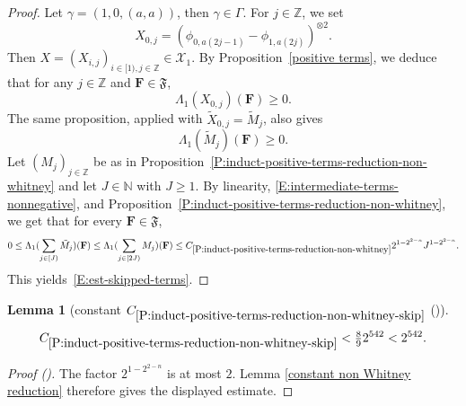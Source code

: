 \documentclass[12pt,reqno]{amsart}
\newcommand{\auto}{{({\tiny\faCar})}}
\theoremstyle{plain}
\newtheorem{lemma}[theorem]{Lemma}
\numberwithin{equation}{section}
\theoremstyle{remark}
\newcommand{\uses}[1]{}
\newcommand{\usesdefs}[1]{}
\newcommand{\Z}{{\mathbb Z}}
\newcommand{\N}{{\mathbb N}}
\begin{document}
\begin{proof}
Let $\gamma=(1,0,(a,a))$, then $\gamma \in \Gamma$. For $j\in \Z$, we set
\[
X_{0,j}=({\phi}_{0,a(2j-1)}-{\phi}_{1,a(2j)})^{\otimes 2}.
\]
Then $X=(X_{i,j})_{i\in [1),j\in \Z} \in \mathcal X_1$. By Proposition~\ref{positive terms}, we deduce that for any $j\in \Z$ and $\mathbf{F} \in \mathfrak{F}$,
\begin{equation}\label{E:intermediate-terms-nonnegative}
\Lambda_1(X_{0,j})(\mathbf{F}) \geq 0.
\end{equation}
The same proposition, applied with $\widetilde X_{0,j}=\widetilde M_j$, also gives
\[
\Lambda_1(\widetilde M_j)(\mathbf F)\ge0.
\]
Let $(M_j)_{j\in \Z}$ be as in Proposition~\ref{P:induct-positive-terms-reduction-non-whitney} and let $J\in\N$ with $J\ge1$. By linearity, \eqref{E:intermediate-terms-nonnegative}, and Proposition~\ref{P:induct-positive-terms-reduction-non-whitney}, we get that for every $\mathbf{F} \in \mathfrak{F}$,
\[
0\le\Lambda_1(\sum_{j\in [J)} \tilde{M}_j)(\mathbf{F})
\leq \Lambda_1(\sum_{j\in [2J)} M_j)(\mathbf{F})
\leq C_{\ref{P:induct-positive-terms-reduction-non-whitney}} 2^{1-2^{2-n}} J^{1-2^{2-n}}.
\]
This yields~\eqref{E:est-skipped-terms}.
\end{proof}

\begin{lemma}[constant $C_{\ref{P:induct-positive-terms-reduction-non-whitney-skip}}$ \auto]\label{constant non Whitney skip reduction}\uses{constant non Whitney reduction,P:induct-positive-terms-reduction-non-whitney-skip}\usesdefs{}
\begin{equation}\label{constant non Whitney skip reduction bound}
C_{\ref{P:induct-positive-terms-reduction-non-whitney-skip}}
<\tfrac89 2^{542}<2^{542}.
\end{equation}
\end{lemma}
\begin{proof}[Proof \auto]
The factor $2^{1-2^{2-n}}$ is at most $2$. Lemma \ref{constant non Whitney reduction} therefore gives the displayed estimate.
\end{proof}
\end{document}

